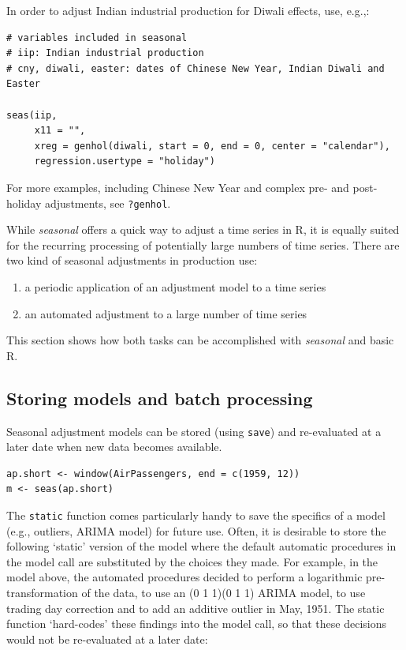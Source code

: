 In order to adjust Indian industrial production for Diwali effects, use,
e.g.,:

\begin{verbatim}
# variables included in seasonal
# iip: Indian industrial production
# cny, diwali, easter: dates of Chinese New Year, Indian Diwali and Easter

seas(iip, 
     x11 = "",
     xreg = genhol(diwali, start = 0, end = 0, center = "calendar"), 
     regression.usertype = "holiday")
\end{verbatim}

For more examples, including Chinese New Year and complex pre- and
post-holiday adjustments, see \texttt{?genhol}.


While \emph{seasonal} offers a quick way to adjust a time series in R,
it is equally suited for the recurring processing of potentially large
numbers of time series. There are two kind of seasonal adjustments in
production use:

\begin{enumerate}
\def\labelenumi{\arabic{enumi}.}
\itemsep1pt\parskip0pt
\item
  a periodic application of an adjustment model to a time series
\item
  an automated adjustment to a large number of time series
\end{enumerate}

This section shows how both tasks can be accomplished with
\emph{seasonal} and basic R.

\subsection{Storing models and batch
processing}\label{storing-models-and-batch-processing}

Seasonal adjustment models can be stored (using \texttt{save}) and
re-evaluated at a later date when new data becomes available.

\begin{verbatim}
ap.short <- window(AirPassengers, end = c(1959, 12))
m <- seas(ap.short)
\end{verbatim}

The \texttt{static} function comes particularly handy to save the
specifics of a model (e.g., outliers, ARIMA model) for future use.
Often, it is desirable to store the following `static' version of the
model where the default automatic procedures in the model call are
substituted by the choices they made. For example, in the model above,
the automated procedures decided to perform a logarithmic pre-
transformation of the data, to use an (0 1 1)(0 1 1) ARIMA model, to use
trading day correction and to add an additive outlier in May, 1951. The
static function `hard-codes' these findings into the model call, so that
these decisions would not be re-evaluated at a later date:

